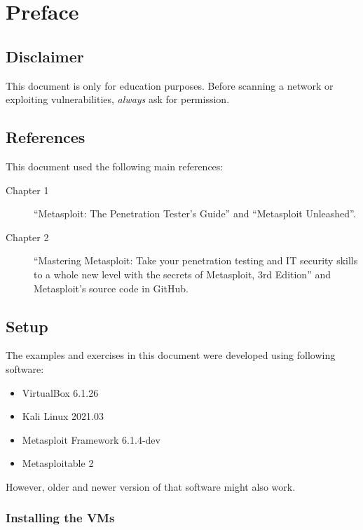 \chapter{Preface}

\section*{Disclaimer} 
This document is only for education purposes. Before scanning a network or exploiting vulnerabilities, \textit{always} ask for permission.

\section*{References}

This document used the following main references: 
\begin{description}
    \item[Chapter 1] ``Metasploit: The Penetration Tester's Guide''\cite{metasploit-penetration} and ``Metasploit Unleashed''\cite{metasploit-unleashed}.
    \item[Chapter 2] ``Mastering Metasploit: Take your penetration testing and IT security skills to a whole new level with the secrets of Metasploit, 3rd Edition''\cite{mastering-metasploit} and Metasploit's source code in GitHub\cite{metasploit-github}.
\end{description}

\section*{Setup} 

The examples and exercises in this document were developed using following software:

\begin{itemize}
    \item VirtualBox 6.1.26\cite{virtualbox-site}
    \item Kali Linux 2021.03\cite{kali-site}
    \item Metasploit Framework 6.1.4-dev\cite{metasploit-site}
    \item Metasploitable 2\cite{metasploitable-site}
\end{itemize}

However, older and newer version of that software might also work.

\subsection*{Installing the VMs}

